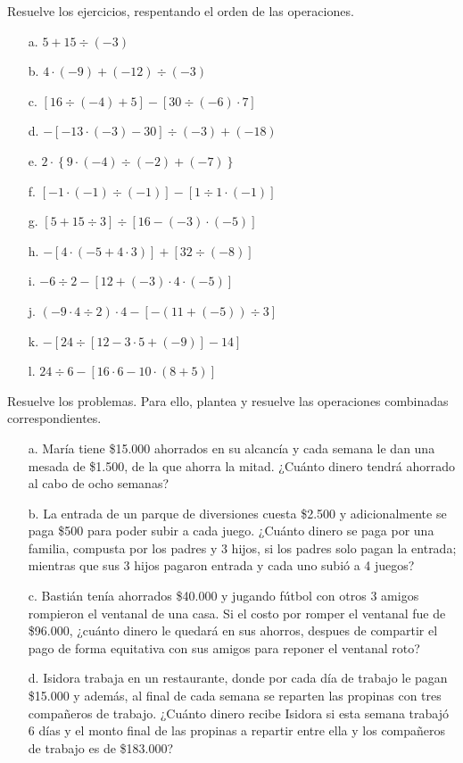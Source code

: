 \documentclass[spanish,letterpaper, 11pt, addpoints, answers]{exam}
\begin{document}
\begin{questions}
    \question Resuelve los ejercicios, respentando el orden de las operaciones.
    \begin{multicols}{2}
      \begin{itemize}
        \item[a.] $5+15\div (-3)$
        \item[b.] $4\cdot (-9)+(-12)\div (-3)$
        \item[c.] $[16\div (-4)+5]-[30\div (-6)\cdot 7]$
        \item[d.] $-[-13\cdot (-3)-30]\div (-3)+(-18)$ 
        \item[e.] $2\cdot \left\{ 9\cdot (-4)\div (-2)+(-7)\right\}$
        \item[f.] $[-1\cdot (-1)\div (-1)]-[1\div 1\cdot (-1)]$
        \item[g.] $[5+15\div 3]\div [16-(-3)\cdot (-5)]$
        \item[h.] $-[4\cdot (-5+4\cdot 3)]+[32\div (-8)]$
        \item[i.] $-6\div 2-[12+(-3)\cdot 4\cdot (-5)]$
        \item[j.] $(-9\cdot 4\div 2)\cdot 4-[-(11+(-5))\div 3]$
        \item[k.] $-[24\div [12-3\cdot 5+(-9)]-14]$
        \item[l.] $24\div 6-[16\cdot 6-10\cdot (8+5)]$   
      \end{itemize}
      
    \end{multicols}

    \question Resuelve los problemas. Para ello, plantea y resuelve las operaciones combinadas correspondientes.

    \begin{itemize}
      \item[a.] María tiene \$15.000 ahorrados en su alcancía y cada semana le dan una mesada de \$1.500, de la que ahorra la mitad. ¿Cuánto dinero tendrá ahorrado al cabo de ocho semanas?
      \item[b.] La entrada de un parque de diversiones cuesta \$2.500 y adicionalmente se paga \$500 para poder subir a cada juego. ¿Cuánto dinero se paga por una familia, compusta por los padres y 3 hijos, si los padres solo pagan la entrada; mientras que sus 3 hijos pagaron entrada y cada uno subió a 4 juegos?
      \item[c.] Bastián tenía ahorrados \$40.000 y jugando fútbol con otros 3 amigos rompieron el ventanal de una casa. Si el costo por romper el ventanal fue de \$96.000, ¿cuánto dinero le quedará en sus ahorros, despues de compartir el pago de forma equitativa con sus amigos para reponer el ventanal roto?
      \item[d.] Isidora trabaja en un restaurante, donde por cada día de trabajo le pagan \$15.000 y además, al final de cada semana se reparten las propinas con tres compañeros de trabajo. ¿Cuánto dinero recibe Isidora si esta semana trabajó 6 días y el monto final de las propinas a repartir entre ella y los compañeros de trabajo es de \$183.000?
    \end{itemize}

\end{questions}
\end{document}
